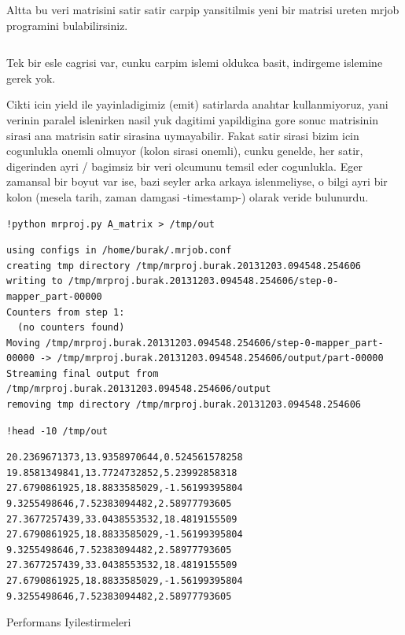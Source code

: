 \documentclass[12pt,fleqn]{article}\usepackage{../common}
\begin{document}
Altta bu veri matrisini satir satir carpip yansitilmis yeni bir
matrisi ureten mrjob programini bulabilirsiniz.

\inputminted{python}{mrproj.py}

Tek bir esle cagrisi var, cunku carpim islemi oldukca basit, indirgeme
islemine gerek yok.

Cikti icin yield ile yayinladigimiz (emit) satirlarda anahtar
kullanmiyoruz, yani verinin paralel islenirken nasil yuk dagitimi
yapildigina gore sonuc matrisinin sirasi ana matrisin satir sirasina
uymayabilir. Fakat satir sirasi bizim icin cogunlukla onemli olmuyor
(kolon sirasi onemli), cunku genelde, her satir, digerinden ayri /
bagimsiz bir veri olcumunu temsil eder cogunlukla. Eger zamansal bir
boyut var ise, bazi seyler arka arkaya islenmeliyse, o bilgi ayri bir
kolon (mesela tarih, zaman damgasi -timestamp-) olarak veride
bulunurdu.

\begin{verbatim}
!python mrproj.py A_matrix > /tmp/out
\end{verbatim}

\begin{verbatim}
using configs in /home/burak/.mrjob.conf
creating tmp directory /tmp/mrproj.burak.20131203.094548.254606
writing to /tmp/mrproj.burak.20131203.094548.254606/step-0-mapper_part-00000
Counters from step 1:
  (no counters found)
Moving /tmp/mrproj.burak.20131203.094548.254606/step-0-mapper_part-00000 -> /tmp/mrproj.burak.20131203.094548.254606/output/part-00000
Streaming final output from /tmp/mrproj.burak.20131203.094548.254606/output
removing tmp directory /tmp/mrproj.burak.20131203.094548.254606
\end{verbatim}

\begin{verbatim}
!head -10 /tmp/out
\end{verbatim}

\begin{verbatim}
20.2369671373,13.9358970644,0.524561578258
19.8581349841,13.7724732852,5.23992858318
27.6790861925,18.8833585029,-1.56199395804
9.3255498646,7.52383094482,2.58977793605
27.3677257439,33.0438553532,18.4819155509
27.6790861925,18.8833585029,-1.56199395804
9.3255498646,7.52383094482,2.58977793605
27.3677257439,33.0438553532,18.4819155509
27.6790861925,18.8833585029,-1.56199395804
9.3255498646,7.52383094482,2.58977793605
\end{verbatim}

Performans Iyilestirmeleri
\end{document}
